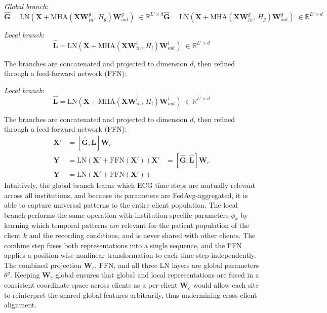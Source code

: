 \documentclass[conference]{IEEEtran}
\begin{document}
{\emph{Global branch}:
\begin{equation}
  \hat{\mathbf{G}} =
  \mathrm{LN}\!\left(\mathbf{X} +
  \mathrm{MHA}\!\left(\mathbf{X}\mathbf{W}_{in}^g,\,H_g\right)
  \mathbf{W}_{out}^g\right) \;\in \mathbb{R}^{L' \times d}
  \label{eq:global_branch}
  \hat{\mathbf{G}} =
  \mathrm{LN}\!\left(\mathbf{X} +
  \mathrm{MHA}\!\left(\mathbf{X}\mathbf{W}_{in}^g,\,H_g\right)
  \mathbf{W}_{out}^g\right) \;\in \mathbb{R}^{L' \times d}
  \label{eq:global_branch}
\end{equation}

\emph{Local branch}:
\begin{equation}
  \hat{\mathbf{L}} =
  \mathrm{LN}\!\left(\mathbf{X} +
  \mathrm{MHA}\!\left(\mathbf{X}\mathbf{W}_{in}^l,\,H_l\right)
  \mathbf{W}_{out}^l\right) \;\in \mathbb{R}^{L' \times d}
  \label{eq:local_branch}
\end{equation}

The branches are concatenated and projected to dimension $d$,
then refined through a feed-forward network (FFN):

\emph{Local branch}:
\begin{equation}
  \hat{\mathbf{L}} =
  \mathrm{LN}\!\left(\mathbf{X} +
  \mathrm{MHA}\!\left(\mathbf{X}\mathbf{W}_{in}^l,\,H_l\right)
  \mathbf{W}_{out}^l\right) \;\in \mathbb{R}^{L' \times d}
  \label{eq:local_branch}
\end{equation}

The branches are concatenated and projected to dimension $d$,
then refined through a feed-forward network (FFN):
\begin{align}
  \mathbf{X}' &=
    [\hat{\mathbf{G}};\hat{\mathbf{L}}]
    \mathbf{W}_c \label{eq:combine} \\
  \mathbf{Y} &=
    \mathrm{LN}\!\left(\mathbf{X}' +
    \mathrm{FFN}(\mathbf{X}')\right)
  \mathbf{X}' &=
    [\hat{\mathbf{G}};\hat{\mathbf{L}}]
    \mathbf{W}_c \label{eq:combine} \\
  \mathbf{Y} &=
    \mathrm{LN}\!\left(\mathbf{X}' +
    \mathrm{FFN}(\mathbf{X}')\right)
\end{align}
Intuitively, the global branch learns which ECG time steps are mutually relevant across all institutions, and because its parameters are FedAvg-aggregated, it is able to capture universal patterns to the entire client population. The local branch performs the same operation with institution-specific parameters $\phi_k$ by learning which temporal patterns are relevant for the patient population of the client $k$ and the recording conditions, and is never shared with other clients. The combine step fuses both representations into a single sequence, and the FFN applies a position-wise nonlinear transformation to each time step independently. The combined projection $\mathbf{W}_c$, FFN, and all three LN layers are global parameters $\theta^g$. Keeping $\mathbf{W}_c$ global ensures that global and local representations are fused in a consistent coordinate space across clients as a per-client $\mathbf{W}_c$ would allow each site to reinterpret the shared global features arbitrarily, thus undermining cross-client alignment.

}
\end{document}
